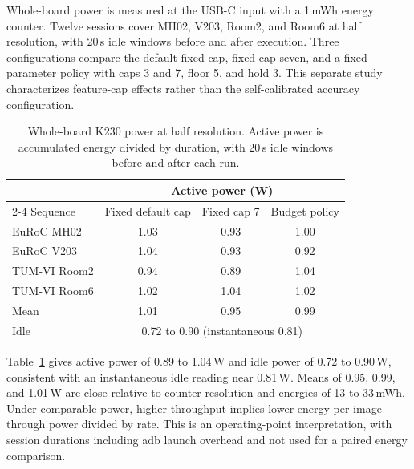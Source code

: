 Whole-board power is measured at the USB-C input with a 1\,mWh energy counter. Twelve sessions cover MH02, V203, Room2, and Room6 at half resolution, with 20\,s idle windows before and after execution. Three configurations compare the default fixed cap, fixed cap seven, and a fixed-parameter policy with caps 3 and 7, floor 5, and hold 3. This separate study characterizes feature-cap effects rather than the self-calibrated accuracy configuration.

\begin{table}[!t]
\caption{Whole-board K230 power at half resolution. Active power is accumulated energy divided by duration, with 20\,s idle windows before and after each run.}
\label{tab:k230_power}
\centering
\scriptsize
\setlength{\tabcolsep}{4pt}
\begin{tabular*}{\columnwidth}{@{\extracolsep{\fill}}lccc@{}}
\toprule
& \multicolumn{3}{c}{Active power (W)} \\
\cmidrule(lr){2-4}
Sequence & Fixed default cap & Fixed cap 7 & Budget policy \\
\midrule
EuRoC MH02 & 1.03 & 0.93 & 1.00 \\
EuRoC V203 & 1.04 & 0.93 & 0.92 \\
TUM-VI Room2 & 0.94 & 0.89 & 1.04 \\
TUM-VI Room6 & 1.02 & 1.04 & 1.02 \\
\midrule
Mean & 1.01 & 0.95 & 0.99 \\
Idle & \multicolumn{3}{c}{0.72 to 0.90 (instantaneous 0.81)} \\
\bottomrule
\end{tabular*}
\end{table}

Table~\ref{tab:k230_power} gives active power of 0.89 to 1.04\,W and idle power of 0.72 to 0.90\,W, consistent with an instantaneous idle reading near 0.81\,W. Means of 0.95, 0.99, and 1.01\,W are close relative to counter resolution and energies of 13 to 33\,mWh. Under comparable power, higher throughput implies lower energy per image through power divided by rate. This is an operating-point interpretation, with session durations including adb launch overhead and not used for a paired energy comparison.
